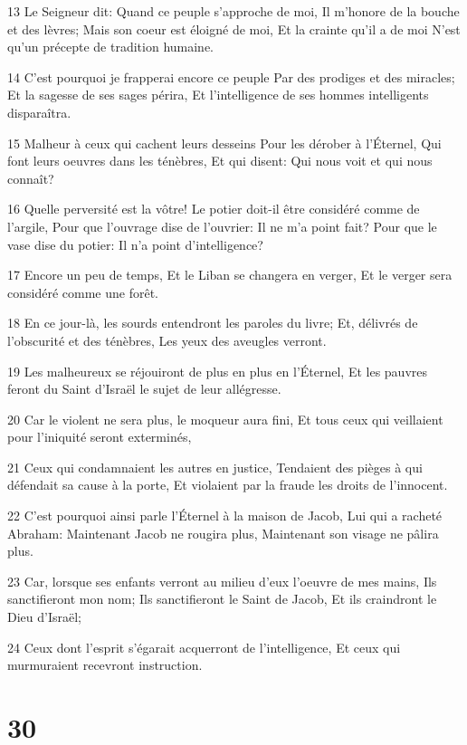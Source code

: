 \par 13 Le Seigneur dit: Quand ce peuple s'approche de moi, Il m'honore de la bouche et des lèvres; Mais son coeur est éloigné de moi, Et la crainte qu'il a de moi N'est qu'un précepte de tradition humaine.
\par 14 C'est pourquoi je frapperai encore ce peuple Par des prodiges et des miracles; Et la sagesse de ses sages périra, Et l'intelligence de ses hommes intelligents disparaîtra.
\par 15 Malheur à ceux qui cachent leurs desseins Pour les dérober à l'Éternel, Qui font leurs oeuvres dans les ténèbres, Et qui disent: Qui nous voit et qui nous connaît?
\par 16 Quelle perversité est la vôtre! Le potier doit-il être considéré comme de l'argile, Pour que l'ouvrage dise de l'ouvrier: Il ne m'a point fait? Pour que le vase dise du potier: Il n'a point d'intelligence?
\par 17 Encore un peu de temps, Et le Liban se changera en verger, Et le verger sera considéré comme une forêt.
\par 18 En ce jour-là, les sourds entendront les paroles du livre; Et, délivrés de l'obscurité et des ténèbres, Les yeux des aveugles verront.
\par 19 Les malheureux se réjouiront de plus en plus en l'Éternel, Et les pauvres feront du Saint d'Israël le sujet de leur allégresse.
\par 20 Car le violent ne sera plus, le moqueur aura fini, Et tous ceux qui veillaient pour l'iniquité seront exterminés,
\par 21 Ceux qui condamnaient les autres en justice, Tendaient des pièges à qui défendait sa cause à la porte, Et violaient par la fraude les droits de l'innocent.
\par 22 C'est pourquoi ainsi parle l'Éternel à la maison de Jacob, Lui qui a racheté Abraham: Maintenant Jacob ne rougira plus, Maintenant son visage ne pâlira plus.
\par 23 Car, lorsque ses enfants verront au milieu d'eux l'oeuvre de mes mains, Ils sanctifieront mon nom; Ils sanctifieront le Saint de Jacob, Et ils craindront le Dieu d'Israël;
\par 24 Ceux dont l'esprit s'égarait acquerront de l'intelligence, Et ceux qui murmuraient recevront instruction.

\chapter{30}

